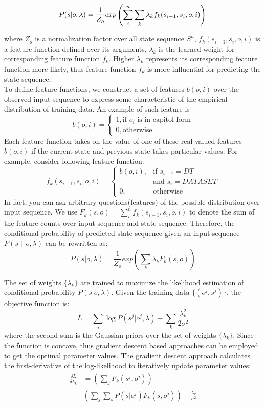 \documentclass[10pt]{article}
\begin{document}
\[
P(s | o,\lambda) = \frac{1}{Z_o} exp \left( \sum_{i}^n \sum_{k} \lambda_{k} f_{k}(s_{i-1}, s_{i}, o, i) \right)  \\
\]

where $Z_o$ is a normalization factor over all state sequence $S^n$, $f_{k}(s_{i-1}, s_{i}, o, i)$ is a feature function defined over its arguments, $\lambda_{k}$ is the learned weight for corresponding feature function $f_k$. Higher $\lambda_{k}$ represents its corresponding feature function more likely, thus feature function $f_k$ is more influential for predicting the state sequence. \\

To define feature functions, we construct a set of features $b(o, i)$ over the observed input sequence to express some characteristic of the empirical distribution of training data. An example of such feature is\\
\[
	b(o, i) = 
	\begin{cases}
		1, \text{if $o_i$ is in capitol form} \\
		0, \text{otherwise}
	\end{cases}
\]
Each feature function takes on the value of one of these real-valued features $b(o, i)$ if the current state and previous state takes particular values. For example, consider following feature function:
\[
	f_k(s_{i-1}, s_i, o, i) = 
	\begin{cases}
		b(o, i), &\text{if $s_{i-1} = DT$} \\
			  & \text{and $s_{i} = DATASET$}\\
		0,	   &\text{otherwise}
	\end{cases}
\]
In fact, you can ask arbitrary questions(features) of the possible distribution over input sequence. We use $F_k(s, o) = \sum_{i}^n f_{k}(s_{i-1}, s_{i}, o, i)$ to denote the sum of the feature counts over input sequence and state sequence. Therefore, the conditional probability of predicted state sequence given an input sequence $P(s \| o, \lambda)$ can be rewritten as:
\[
	P(s | o, \lambda) = \frac{1}{Z_o} exp \left( \sum_{k} \lambda_{k} F_k(s, o) \right)
\]

The set of weights $\{ \lambda_k \}$ are trained to maximize the likelihood estimation of conditional probability $P(s | o, \lambda)$. Given the training data $\{(o^j, s^j)\}$, the objective function is:
\[
	L = \sum_{j} \log P(s^j | o^j, \lambda) -\sum_k \frac{\lambda_k^2}{2 \sigma^2} 
\]
where the second sum is the Gaussian priors over the set of weights $\{ \lambda_k \}$. Since the function is concave, thus gradient descent based approaches can be employed to get the optimal parameter values. The gradient descent approach calculates the first-derivative of the log-likelihood to iteratively update parameter values:
\begin{align*}
	\frac{\delta L}{\delta \lambda_k} & = \left( \sum_j F_k(s^j, o^j) \right) - \\
							& \left( \sum_j \sum_s P(s|o^j) F_k(s, o^j)\right) - \frac{\lambda_k}{\sigma^2} 
\end{align*}
\end{document}
